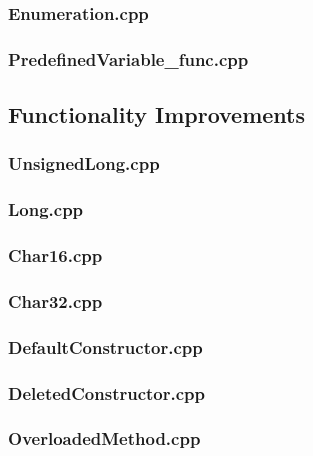 \documentclass[11pt,]{report}
\begin{document}
\begin{appendix}
\subsubsection{Enumeration.cpp}
\label{sub:Enumeration}


\subsubsection{PredefinedVariable\_func.cpp}
\label{sub:PredefinedVariable_func}


\subsection{Functionality Improvements}
\label{subsection:Functionality}

\subsubsection{UnsignedLong.cpp}
\label{sub:UnsignedLong.cpp}


\subsubsection{Long.cpp}
\label{sub:LongLong}


\subsubsection{Char16.cpp}
\label{sub:Char16}


\subsubsection{Char32.cpp}
\label{sub:Char32}


\subsubsection{DefaultConstructor.cpp}
\label{sub:DefaultConstructor}


\subsubsection{DeletedConstructor.cpp}
\label{sub:DeletedConstructor}


\subsubsection{OverloadedMethod.cpp}
\label{sub:OverloadedMethod.cpp}


\end{appendix}
\end{document}

